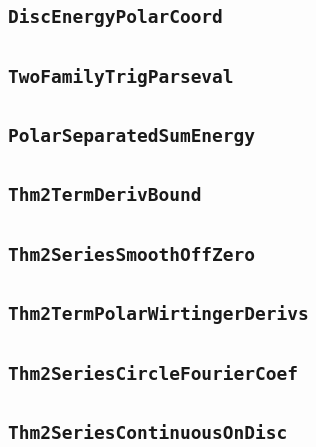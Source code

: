 \documentclass[11pt]{amsart}
\theoremstyle{definition}
\begin{document}
\subsection{\texorpdfstring{\texttt{DiscEnergyPolarCoord}}{DiscEnergyPolarCoord}}\label{node:DiscEnergyPolarCoord}


\subsection{\texorpdfstring{\texttt{TwoFamilyTrigParseval}}{TwoFamilyTrigParseval}}\label{node:TwoFamilyTrigParseval}


\subsection{\texorpdfstring{\texttt{PolarSeparatedSumEnergy}}{PolarSeparatedSumEnergy}}\label{node:PolarSeparatedSumEnergy}


\subsection{\texorpdfstring{\texttt{Thm2TermDerivBound}}{Thm2TermDerivBound}}\label{node:Thm2TermDerivBound}


\subsection{\texorpdfstring{\texttt{Thm2SeriesSmoothOffZero}}{Thm2SeriesSmoothOffZero}}\label{node:Thm2SeriesSmoothOffZero}


\subsection{\texorpdfstring{\texttt{Thm2TermPolarWirtingerDerivs}}{Thm2TermPolarWirtingerDerivs}}\label{node:Thm2TermPolarWirtingerDerivs}


\subsection{\texorpdfstring{\texttt{Thm2SeriesCircleFourierCoef}}{Thm2SeriesCircleFourierCoef}}\label{node:Thm2SeriesCircleFourierCoef}


\subsection{\texorpdfstring{\texttt{Thm2SeriesContinuousOnDisc}}{Thm2SeriesContinuousOnDisc}}\label{node:Thm2SeriesContinuousOnDisc}

\end{document}
